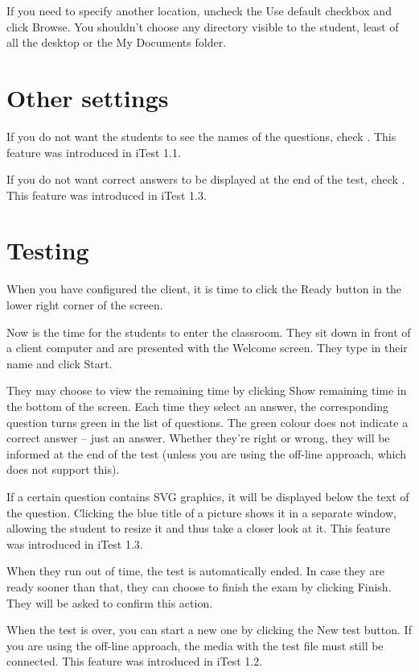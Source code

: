 If you need to specify another location, uncheck the Use default checkbox and click Browse.
You shouldn't choose any directory visible to the student, least of all the desktop or the My Documents folder.

\section{Other settings}


If you do not want the students to see the names of the questions, check .
This feature was introduced in iTest 1.1.


If you do not want correct answers to be displayed at the end of the test, check .
This feature was introduced in iTest 1.3.

\section{Testing}

When you have configured the client, it is time to click the Ready button in the lower right corner of the screen.

Now is the time for the students to enter the classroom.
They sit down in front of a client computer and are presented with the Welcome screen.
They type in their name and click Start.

They may choose to view the remaining time by clicking Show remaining time in the bottom of the screen.
Each time they select an answer, the corresponding question turns green in the list of questions.
The green colour does not indicate a correct answer -- just an answer.
Whether they're right or wrong, they will be informed at the end of the test (unless you are using the off-line approach, which does not support this).

If a certain question contains SVG graphics, it will be displayed below the text of the question.
Clicking the blue title of a picture shows it in a separate window, allowing the student to resize it and thus take a closer look at it.
This feature was introduced in iTest 1.3.

When they run out of time, the test is automatically ended.
In case they are ready sooner than that, they can choose to finish the exam by clicking Finish.
They will be asked to confirm this action.


When the test is over, you can start a new one by clicking the New test button.
If you are using the off-line approach, the media with the test file must still be connected.
This feature was introduced in iTest 1.2.
